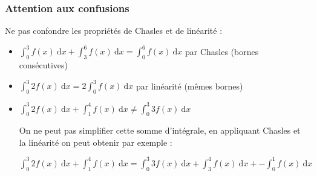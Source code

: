 \documentclass[11pt, hyperref={urlcolor=red,%
            linkcolor=blue, %
            colorlinks=true}]{beamer}
\newcommand{\dx}{\ensuremath{\text{d}x}}		%
\newcommand{\integralex}[3]{\int_{#1}^{#2} #3 \ \dx}
\begin{document}
\begin{frame}
\frametitle{Attention aux confusions}
\label{linearite}

\bcattention{} Ne pas confondre les propriétés de Chasles et de linéarité : 

\begin{itemize}


\item  $\integralex{0}{3}{f(x)}+\integralex{3}{6}{f(x)}=\integralex{0}{6}{f(x)}$ par  Chasles (bornes consécutives)
 
  \item $\integralex{0}{3}{2f(x)}=2\integralex{0}{3}{f(x)}$ par linéarité  (mêmes bornes)
  
   
  \item $\integralex{0}{3}{2f(x)}+ \integralex{1}{4}{f(x)}\neq \integralex{0}{3}{3f(x)}$ 
  
 On ne peut pas simplifier cette somme d'intégrale, en appliquant Chasles et la linéarité on peut obtenir par exemple :
  
   $\integralex{0}{3}{2f(x)}+ \integralex{1}{4}{f(x)} =\integralex{0}{3}{3f(x)} +  \integralex{3}{4}{f(x)} +  -\integralex{0}{1}{f(x)} $ 
  
\end{itemize}


\end{frame}
\end{document}

